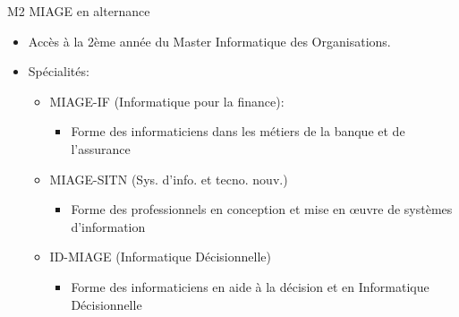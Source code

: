 \documentclass[minimal,compress]{beamer}
\begin{document}
\begin{frame}{M2 MIAGE en alternance}

\begin{itemize}
\item Accès à la \alert{2ème année} du Master Informatique des Organisations.
\item Spécialités:
\begin{itemize}
\item \alert{MIAGE-IF} (Informatique pour la finance):
\begin{itemize}
\item Forme des informaticiens dans les métiers de la \alert{banque et de l’assurance}
\end{itemize}
\item \alert{MIAGE-SITN} (Sys. d’info. et tecno. nouv.)
\begin{itemize}
\item Forme des professionnels en conception et mise en œuvre de \alert{systèmes d’information}
\end{itemize}
\item \alert{ID-MIAGE} (Informatique Décisionnelle)
\begin{itemize}
\item Forme des informaticiens en \alert{aide à la décision et en Informatique Décisionnelle}
\end{itemize}
\end{itemize}
\end{itemize}

\end{frame}

\end{document}
